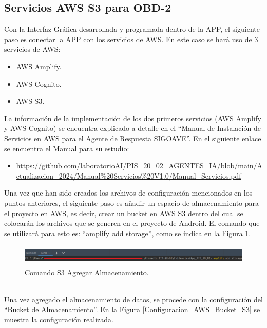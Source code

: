 \documentclass[a4paper,10pt, oneside, titlepage]{article}
\begin{document}
	\subsection{Servicios AWS S3 para OBD-2}\label{Eltiqueta_Servicios_S3_AWS}
	Con la Interfaz Gráfica desarrollada y programada dentro de la APP, el siguiente paso es conectar la APP con los servicios de AWS. En este caso se hará uso de 3 servicios de AWS:
	\begin{itemize}
		\item AWS Amplify.
		\item AWS Cognito.
		\item AWS S3.
	\end{itemize}
	\indent\indent La información de la implementación de los dos primeros servicios (AWS Amplify y AWS Cognito) se encuentra explicado a detalle en el ``Manual de Instalación de Servicios en AWS para el Agente de Respuesta SIGOAVE''.  En el siguiente enlace se encuentra el Manual para su estudio:
	\begin{itemize}
		\item \textcolor{blue}{\url{https://github.com/laboratorioAI/PIS_20_02_AGENTES_IA/blob/main/Actualizacion_2024/Manual\%20Servicios\%20V1.0/Manual_Servicios.pdf}}
	\end{itemize}
	\indent\newline\indent Una vez que han sido creados los archivos de configuración mencionados en los puntos anteriores, el siguiente paso es añadir un espacio de almacenamiento para el proyecto en AWS, es decir, crear un bucket en AWS S3 dentro del cual se colocarán los archivos que se generen en el proyecto de Android. El comando que se utilizará para esto es: ``amplify add storage'', como se indica en la Figura \ref{AWS_Add_Storage}.
	\begin{figure}[!h]
		\centering
		\includegraphics[width = 1\linewidth, height = 1cm]{AWS_Add_Storage.png}
		\caption{Comando S3 Agregar Almacenamiento.}
		\label{AWS_Add_Storage}
	\end{figure} \\
	\indent Una vez agregado el almacenamiento de datos, se procede con la configuración del ``Bucket de Almacenamiento''. En la Figura \ref{Configuracion_AWS_Bucket_S3} se muestra la configuración realizada.
\end{document}
